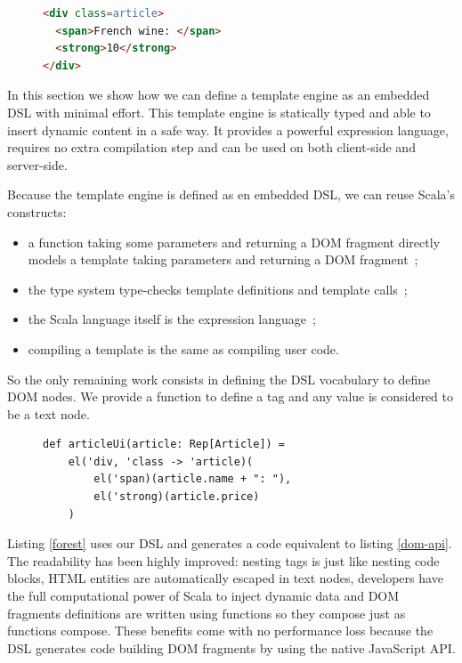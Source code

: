 \documentclass[preprint]{sigplanconf}
\begin{document}
\begin{figure}
\begin{lstlisting}[language=HTML,caption=HTML,label=html]
<div class=article>
  <span>French wine: </span>
  <strong>10</strong>
</div>
\end{lstlisting}
\end{figure}

In this section we show how we can define a template engine as an embedded DSL with minimal effort. This template
engine is statically typed and able to insert dynamic content in a safe way. It provides a powerful expression
language, requires no extra compilation step and can be used on both client-side and server-side.

Because the template engine is defined as en embedded DSL, we can reuse Scala’s constructs:

\begin{itemize}
\item a function taking some parameters and returning a DOM fragment directly models a template taking parameters and
returning a DOM fragment~;
\item the type system type-checks template definitions and template calls~;
\item the Scala language itself is the expression language~;
\item compiling a template is the same as compiling user code.
\end{itemize}

So the only remaining work consists in defining the DSL vocabulary to define DOM nodes. We provide a 
function to define a tag and any  value is considered to be a text node.

\begin{figure}
\begin{lstlisting}[label=forest,caption=DOM definition DSL]
def articleUi(article: Rep[Article]) =
    el('div, 'class -> 'article)(
        el('span)(article.name + ": "),
        el('strong)(article.price)
    )
\end{lstlisting}
\end{figure}

Listing \ref{forest} uses our DSL and generates a code equivalent to listing \ref{dom-api}. The readability has
been highly improved: nesting tags is just like nesting code blocks, HTML entities are
automatically escaped in text nodes, developers have the full computational power of Scala to inject dynamic data and
DOM fragments definitions are written using functions so they compose just as functions compose. These benefits come
with no performance loss because the DSL generates code building DOM fragments by using the native JavaScript API.
\end{document}
